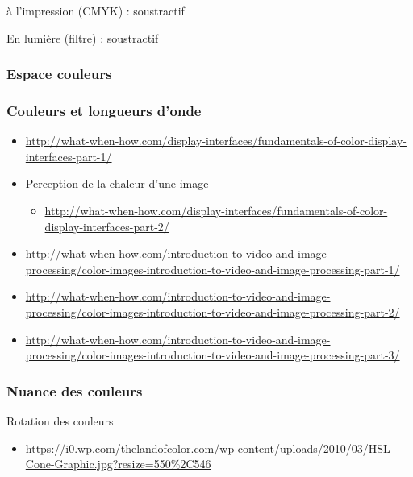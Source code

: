 \documentclass[
  french,
]{book}
\providecommand{\tightlist}{%
  \setlength{\itemsep}{0pt}\setlength{\parskip}{0pt}}
\begin{document}
à l'impression (CMYK) : soustractif

En lumière (filtre) : soustractif

\hypertarget{espace-couleurs}{%
\subsubsection{Espace couleurs}\label{espace-couleurs}}

\hypertarget{couleurs-et-longueurs-donde}{%
\subsubsection{Couleurs et longueurs d'onde}\label{couleurs-et-longueurs-donde}}

\begin{itemize}
\tightlist
\item
  \url{http://what-when-how.com/display-interfaces/fundamentals-of-color-display-interfaces-part-1/}
\item
  Perception de la chaleur d'une image

  \begin{itemize}
  \tightlist
  \item
    \url{http://what-when-how.com/display-interfaces/fundamentals-of-color-display-interfaces-part-2/}
  \end{itemize}
\item
  \url{http://what-when-how.com/introduction-to-video-and-image-processing/color-images-introduction-to-video-and-image-processing-part-1/}
\item
  \url{http://what-when-how.com/introduction-to-video-and-image-processing/color-images-introduction-to-video-and-image-processing-part-2/}
\item
  \url{http://what-when-how.com/introduction-to-video-and-image-processing/color-images-introduction-to-video-and-image-processing-part-3/}
\end{itemize}

\hypertarget{nuance-des-couleurs}{%
\subsubsection{Nuance des couleurs}\label{nuance-des-couleurs}}

Rotation des couleurs

\begin{itemize}
\tightlist
\item
  \url{https://i0.wp.com/thelandofcolor.com/wp-content/uploads/2010/03/HSL-Cone-Graphic.jpg?resize=550\%2C546}
\end{itemize}
\end{document}
